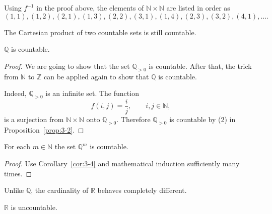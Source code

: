 Using $f^{-1}$ in the proof above, the elements of $\mathbb{N} \times \mathbb{N}$ are listed in order as
\[
  (1,1), (1,2), (2,1), (1,3), (2,2), (3,1), (1,4), (2,3), (3,2), (4,1), \dots.
\]

\begin{cor}
  \label{cor:3-4}
  The Cartesian product of two countable sets is still countable.
\end{cor}

\begin{thm}
  $\mathbb{Q}$ is countable.
\end{thm}

\begin{proof}
  We are going to show that the set $\mathbb{Q}_{>0}$ is countable.
  After that, the trick from $\mathbb{N}$ to $\mathbb{Z}$ can be applied again to show that $\mathbb{Q}$ is countable.

  Indeed, $\mathbb{Q}_{>0}$ is an infinite set.  The function
  \[
    f(i,j) = \frac{i}{j}, \qquad i, j \in \mathbb{N},
  \]
  is a surjection from $\mathbb{N} \times \mathbb{N}$ onto $\mathbb{Q}_{>0}$.
  Therefore $\mathbb{Q}_{>0}$ is countable by (2) in Proposition~\ref{prop:3-2}.
\end{proof}

\begin{cor}
  For each $m \in \mathbb{N}$ the set $\mathbb{Q}^m$ is countable.
\end{cor}

\begin{proof}
  Use Corollary~\ref{cor:3-4} and mathematical induction sufficiently many times.
\end{proof}

Unlike $\mathbb{Q}$, the cardinality of $\mathbb{R}$ behaves completely different.

\begin{thm}
  $\mathbb{R}$ is uncountable.
\end{thm}


